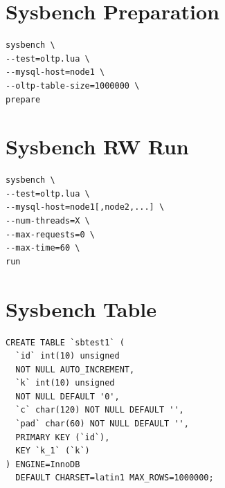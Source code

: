 \documentclass{sig-alternate}
\begin{document}
\section{Sysbench Preparation}
\begin{verbatim}
sysbench \
--test=oltp.lua \
--mysql-host=node1 \
--oltp-table-size=1000000 \
prepare
\end{verbatim}

\section{Sysbench RW Run}
\begin{verbatim}
sysbench \
--test=oltp.lua \
--mysql-host=node1[,node2,...] \
--num-threads=X \
--max-requests=0 \
--max-time=60 \
run
\end{verbatim}

\section{Sysbench Table}
\begin{verbatim}
CREATE TABLE `sbtest1` (
  `id` int(10) unsigned
  NOT NULL AUTO_INCREMENT,
  `k` int(10) unsigned
  NOT NULL DEFAULT '0',
  `c` char(120) NOT NULL DEFAULT '',
  `pad` char(60) NOT NULL DEFAULT '',
  PRIMARY KEY (`id`),
  KEY `k_1` (`k`)
) ENGINE=InnoDB
  DEFAULT CHARSET=latin1 MAX_ROWS=1000000;
\end{verbatim}
\end{document}

